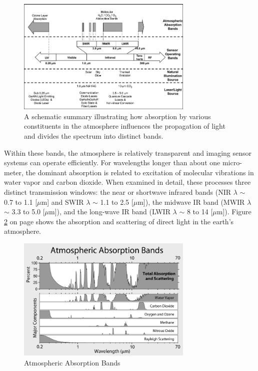 \begin{figure}[ht!]
\centering
\includegraphics[width=0.75\textwidth]{chapters/img/intro_atmosphere.png}
\caption{A schematic summary illustrating how absorption by various constituents in the atmosphere influences the propagation of light and divides the spectrum into distinct bands.}
\label{fig:intro_atmosphere}
\end{figure}

Within these bands, the atmosphere is relatively transparent and imaging sensor systems can operate efficiently. For wavelengths longer than about one micro-meter, the dominant absorption is related to excitation of molecular vibrations in water vapor and carbon dioxide. When examined in detail, these processes three distinct transmission windows: the near or shortwave infrared bands (\acs{NIR} $\lambda$ $\sim$ 0.7 to 1.1 [$\mu$m] and \acs{SWIR} $\lambda$ $\sim$ 1.1 to 2.5 [$\mu$m]), the midwave IR band (\acs{MWIR} $\lambda$ $\sim$ 3.3 to 5.0 [$\mu$m]), and the long-wave IR band (\acs{LWIR} $\lambda$ $\sim$ 8 to 14 [$\mu$m]). Figure \ref{fig:intro_atmosphere_bands} on page \pageref{fig:intro_atmosphere_bands} shows the absorption and scattering of direct light in the earth's atmosphere.

\begin{figure}[ht!]
\centering
\includegraphics[width=0.75\textwidth]{chapters/img/intro_atmosphere_bands.png}
\caption{Atmospheric Absorption Bands}
\label{fig:intro_atmosphere_bands}
\end{figure}

